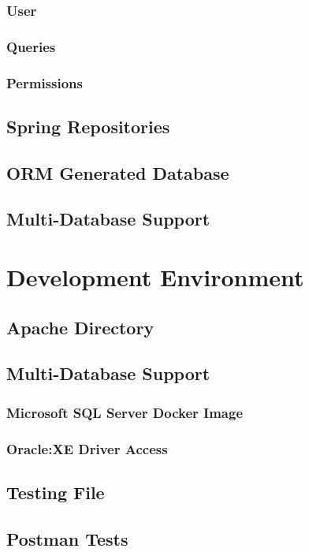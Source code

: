 \subsubsection{User}
\subsubsection{Queries}
\subsubsection{Permissions}
\subsection{Spring Repositories}
\subsection{ORM Generated Database}
\subsection{Multi-Database Support}

\section{Development Environment}
\label{cha:implementation:sec:development}

\subsection{Apache Directory}
\subsection{Multi-Database Support}
\subsubsection{Microsoft SQL Server Docker Image}
\subsubsection{Oracle:XE Driver Access}
\subsection{Testing File}
\subsection{Postman Tests}

